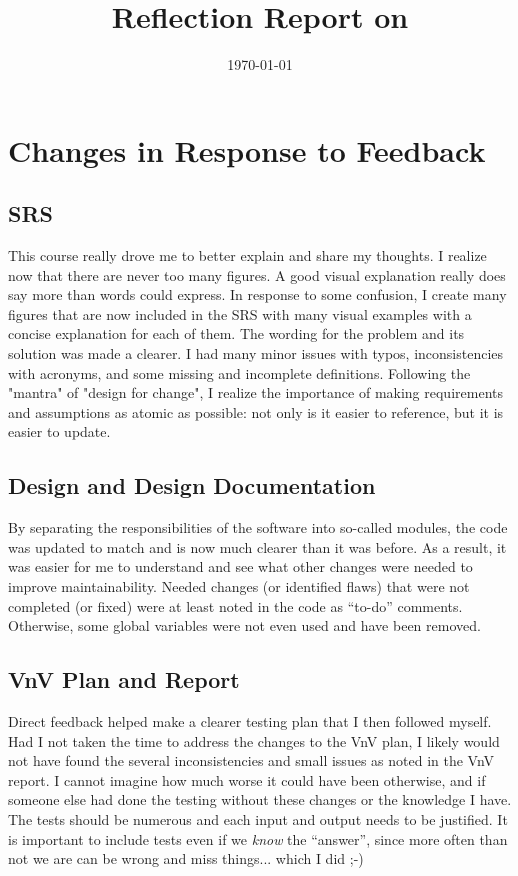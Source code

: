 \documentclass{article}
\title{Reflection Report on \progname}
\author{\authname}
\date{\today}
\begin{document}
\maketitle

\section{Changes in Response to Feedback}

\subsection{SRS}
This course really drove me to better explain and share my thoughts. 
I realize now that there are never too many figures. A good visual explanation
really does say more than words could express. In response to some confusion,
I create many figures that are now included in the SRS with many
visual examples with a concise explanation for each of them.
The wording for the problem and its solution was made a clearer.
I had many minor issues with typos, inconsistencies with acronyms, and
some missing and incomplete definitions.
Following the "mantra" of "design for change",
I realize the importance of making requirements and
assumptions as atomic as possible: not only is it easier to reference, but it
is easier to update.

\subsection{Design and Design Documentation}
By separating the responsibilities of the software into so-called modules,
the code was updated to match and is now much clearer than it was before.
As a result, it was easier for me to understand and see what 
other changes were needed to improve maintainability.
Needed changes (or identified flaws) that were
not completed (or fixed) were at least noted in the
code as ``to-do'' comments. Otherwise, some global variables were not even used
and have been removed.

\subsection{VnV Plan and Report}
Direct feedback helped make a clearer testing plan that I then followed myself.
Had I not taken the time to address the changes to the VnV plan, I likely
would not have found the several inconsistencies and small issues as noted
in the VnV report. I cannot imagine how much worse it could have been otherwise,
and if someone else had done the testing without these changes or the knowledge
I have.
The tests should be numerous and each input and output needs to be justified.
It is important to include tests even if we \textit{know} the ``answer'', since
more often than not we are can be wrong and miss things... which I did ;-)
\end{document}
